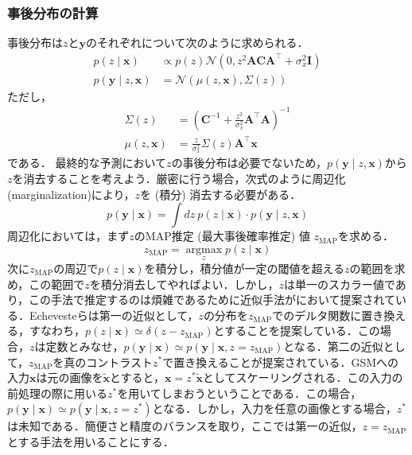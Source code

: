 \subsubsection{事後分布の計算}
事後分布は$z$と$\mathbf{y}$のそれぞれについて次のように求められる．
\begin{align}
p(z \mid \mathbf{x}) &\propto p(z) \mathcal{N}\left(0, z^{2} \mathbf{A C A}^{\top}+\sigma_{x}^{2} \mathbf{I}\right)\\
p(\mathbf{y} \mid z, \mathbf{x})& = \mathcal{N}\left(\mu(z, \mathbf{x}), \Sigma(z)\right)
\end{align}
ただし，
\begin{align}
\Sigma(z)&=\left(\mathbf{C}^{-1}+\frac{z^{2}}{\sigma_{x}^{2}} \mathbf{A}^{\top} \mathbf{A}\right)^{-1}\\
\mu(z, \mathbf{x})&=\frac{z}{\sigma_{x}^{2}} \Sigma(z) \mathbf{A}^{\top} \mathbf{x}
\end{align}
である．
最終的な予測において$z$の事後分布は必要でないため，$p(\mathbf{y} \mid z, \mathbf{x})$から$z$を消去することを考えよう．厳密に行う場合，次式のように周辺化(marginalization)により，$z$を (積分) 消去する必要がある．
\begin{equation}
p(\mathbf{y} \mid \mathbf{x}) = \int dz\ p(z\mid \mathbf{x})\cdot p(\mathbf{y} \mid z, \mathbf{x})
\end{equation}
周辺化においては，まず$z$のMAP推定 (最大事後確率推定) 値 $z_{\mathrm{MAP}}$を求める．
\begin{equation}
z_{\mathrm{MAP}} = \underset{z}{\operatorname{argmax}} p(z\mid \mathbf{x})
\end{equation}
次に$z_{\mathrm{MAP}}$の周辺で$p(z\mid \mathbf{x})$を積分し，積分値が一定の閾値を超える$z$の範囲を求め，この範囲で$z$を積分消去してやればよい．しかし，$z$は単一のスカラー値であり，この手法で推定するのは煩雑であるために近似手法が\citep{Echeveste2017-wu}において提案されている．Echevesteらは第一の近似として，$z$の分布を$z_{\mathrm{MAP}}$でのデルタ関数に置き換える，すなわち，$p(z\mid \mathbf{x})\simeq \delta (z-z_{\mathrm{MAP}})$とすることを提案している．この場合，$z$は定数とみなせ，$p(\mathbf{y} \mid \mathbf{x})\simeq p(\mathbf{y} \mid \mathbf{x}, z=z_{\mathrm{MAP}})$となる．第二の近似として，$z_{\mathrm{MAP}}$を真のコントラスト$z^*$で置き換えることが提案されている．GSMへの入力$\mathbf{x}$は元の画像を$\mathbf{\tilde x}$とすると，$\mathbf{x}=z^* \mathbf{\tilde x}$としてスケーリングされる．この入力の前処理の際に用いる$z^*$を用いてしまおうということである．この場合，$p(\mathbf{y} \mid \mathbf{x})\simeq p(\mathbf{y} \mid \mathbf{x}, z=z^*)$となる．しかし，入力を任意の画像とする場合，$z^*$は未知である．簡便さと精度のバランスを取り，ここでは第一の近似，$z=z_{\mathrm{MAP}}$とする手法を用いることにする．
